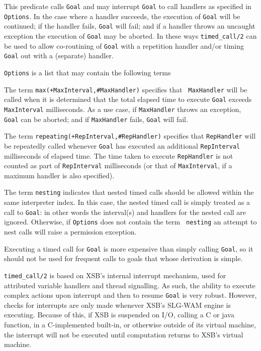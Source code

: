 \begin{description}
%
This predicate calls {\tt Goal} and may interrupt {\tt Goal} to call
handlers as specified in {\tt Options}.  In the case where a handler
succeeds, the execution of {\tt Goal} will be continued; if the
handler fails, {\tt Goal} will fail; and if a handler throws an
uncaught exception the execution of {\tt Goal} may be aborted. In
these ways {\tt timed\_call/2} can be used to allow co-routining of
{\tt Goal} with a repetition handler and/or timing {\tt Goal} out with
a (separate) handler.

{\tt Options} is a list that may contain the following terms
\bi
\item The term {\tt max(+MaxInterval,\#MaxHandler)} specifies that {\tt
  MaxHandler} will be called when it is determined that the total elapsed
  time to execute {\tt Goal} exceeds {\tt MaxInterval} milliseconds.  As
  a use case, if {\tt MaxHandler} throws an exception, {\tt Goal} can be
  aborted; and if {\tt MaxHandler} fails, {\tt Goal} will fail.
%
\item The term {\tt repeating(+RepInterval,\#RepHandler)} specifies that
  {\tt RepHandler} will be repeatedly called whenever {\tt Goal} has
  executed an additional {\tt RepInterval} milliseconds of elapsed time.
  The time taken to execute {\tt RepHandler} is not counted as part of
  {\tt RepInterval} milliseconds (or that of {\tt MaxInterval}, if a
  maximum handler is also specified).
%
\item The term {\tt nesting} indicates that nested timed calls should
  be allowed within the same interpreter index.  In this case, the
  nested timed call is simply treated as a call to {\tt Goal}: in
  other words the interval(s) and handlers for the nested call are
  ignored.  Otherwise, if {\tt Options} does not contain the term {\tt
    nesting} an attempt to nest calls will raise a permission
  exception.  \ei

Executing a timed call for {\tt Goal} is more expensive than simply
calling {\tt Goal}, so it should not be used for frequent calls to
goals that whose derivation is simple.

{\tt timed\_call/2} is based on XSB's internal interrupt mechanism,
used for attributed variable handlers and thread signalling.  As such,
the ability to execute complex actions upon interrupt and then to
resume {\tt Goal} is very robust.  However, checks for interrupts are
only made whenever XSB's SLG-WAM engine is executing.  Because of
this, if XSB is suspended on I/O, calling a C or java function, in a
C-implemented built-in, or otherwise outside of its virtual machine,
the interrupt will not be executed until computation returns to XSB's
virtual machine.


\end{description}
